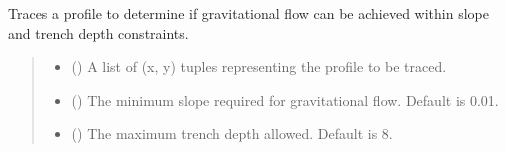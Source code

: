 \documentclass[letterpaper,10pt,english]{sphinxmanual}
\begin{document}

\begin{fulllineitems}
\label{\detokenize{pysewer:pysewer.optimization.needs_pump}}
\pysigstartsignatures
{}
\pysigstopsignatures
\sphinxAtStartPar
Traces a profile to determine if gravitational flow can be achieved within slope and trench depth constraints.
\begin{quote}\begin{description}
\begin{itemize}
\item {} 
\sphinxAtStartPar
{} () \textendash{} A list of (x, y) tuples representing the profile to be traced.

\item {} 
\sphinxAtStartPar
{} (\sphinxstyleliteralemphasis{\sphinxupquote{, }}) \textendash{} The minimum slope required for gravitational flow. Default is \sphinxhyphen{}0.01.

\item {} 
\sphinxAtStartPar
{} (\sphinxstyleliteralemphasis{\sphinxupquote{, }}) \textendash{} The maximum trench depth allowed. Default is 8.


\end{itemize}
\end{description}
\end{quote}
\end{fulllineitems}
\end{document}
